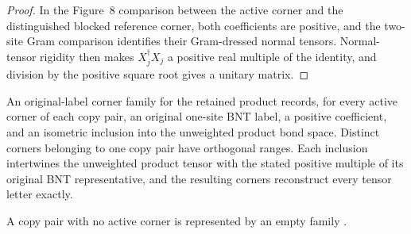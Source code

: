 \begin{proof}\leanok
    In the Figure~8 comparison between the active corner and the
    distinguished blocked reference corner, both coefficients are positive,
    and the two-site Gram comparison identifies their Gram-dressed normal
    tensors. Normal-tensor rigidity then makes $X_j^\dagger X_j$ a positive
    real multiple of the identity, and division by the positive square root
    gives a unitary matrix.
\end{proof}

\begin{definition}
    \label{def:mpdo_original_corner_family}
    \leanok
    An original-label corner family for the retained product records, for
    every active corner of each copy pair, an original one-site BNT label, a
    positive coefficient, and an isometric inclusion into the unweighted product
    bond space. Distinct corners belonging to one copy pair have orthogonal
    ranges. Each inclusion intertwines the unweighted product tensor with the stated
    positive multiple of its original BNT representative, and the resulting
    corners reconstruct every tensor letter exactly.

    A copy pair with no active corner is represented by an empty family
    \cite{gap:cpsv16_figure11_per_pair_support}.
\end{definition}

